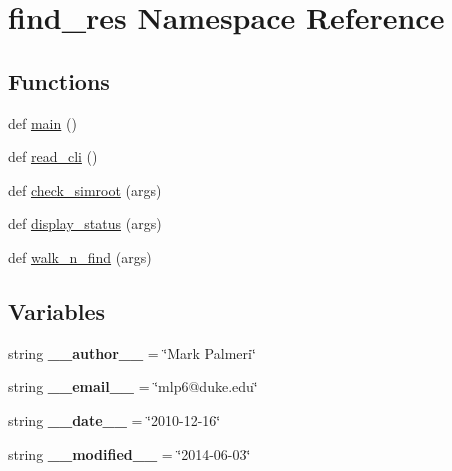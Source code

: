 \hypertarget{namespacefind__res}{}\section{find\+\_\+res Namespace Reference}
\label{namespacefind__res}
\subsection*{Functions}
\begin{DoxyCompactItemize}
\item 
def \hyperlink{namespacefind__res_a2af11f6ebb6faa1ff54caa3ff7c8e4d0}{main} ()
\item 
def \hyperlink{namespacefind__res_a6f61d01cd17b47a7fbcff4eb192a5945}{read\+\_\+cli} ()
\item 
def \hyperlink{namespacefind__res_aee52e3c514f0caefde7bf94ad974b968}{check\+\_\+simroot} (args)
\item 
def \hyperlink{namespacefind__res_aee022bc69aa6356af7c2d9a88000be35}{display\+\_\+status} (args)
\item 
def \hyperlink{namespacefind__res_afd9f8a68a477fad3218a71d600258851}{walk\+\_\+n\+\_\+find} (args)
\end{DoxyCompactItemize}
\subsection*{Variables}
\begin{DoxyCompactItemize}
\item 
\hypertarget{namespacefind__res_a728806305227088f33bee63ae674ee1e}{}string {\bfseries \+\_\+\+\_\+author\+\_\+\+\_\+} = \char`\"{}Mark Palmeri\char`\"{}\label{namespacefind__res_a728806305227088f33bee63ae674ee1e}

\item 
\hypertarget{namespacefind__res_a61ba9c9ac672df8b70658896ffbc5166}{}string {\bfseries \+\_\+\+\_\+email\+\_\+\+\_\+} = \char`\"{}mlp6@duke.\+edu\char`\"{}\label{namespacefind__res_a61ba9c9ac672df8b70658896ffbc5166}

\item 
\hypertarget{namespacefind__res_a2eb1844b89b617f8d362c2c45c8295ab}{}string {\bfseries \+\_\+\+\_\+date\+\_\+\+\_\+} = \char`\"{}2010-\/12-\/16\char`\"{}\label{namespacefind__res_a2eb1844b89b617f8d362c2c45c8295ab}

\item 
\hypertarget{namespacefind__res_a4828c0504a776b6445463dde90113e4f}{}string {\bfseries \+\_\+\+\_\+modified\+\_\+\+\_\+} = \char`\"{}2014-\/06-\/03\char`\"{}\label{namespacefind__res_a4828c0504a776b6445463dde90113e4f}

\end{DoxyCompactItemize}


